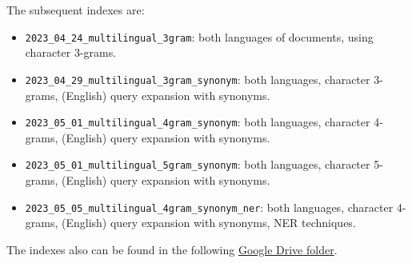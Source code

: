 The subsequent indexes are:
\begin{itemize}
	\item \texttt{2023\_04\_24\_multilingual\_3gram}: both languages of documents, using character 3-grams.
	\item \texttt{2023\_04\_29\_multilingual\_3gram\_synonym}: both languages, character 3-grams, (English) query expansion with synonyms.
	\item \texttt{2023\_05\_01\_multilingual\_4gram\_synonym}: both languages, character 4-grams, (English) query expansion with synonyms.
	\item \texttt{2023\_05\_01\_multilingual\_5gram\_synonym}: both languages, character 5-grams, (English) query expansion with synonyms.
	\item \texttt{2023\_05\_05\_multilingual\_4gram\_synonym\_ner}: both languages, character 4-grams, (English) query expansion with synonyms, NER techniques.
\end{itemize}

The indexes also can be found in the following
\href{https://drive.google.com/drive/folders/1CK_kLeZ5Us3VJe8hiG1vhwPrDs94cLvU?usp=share_link}{Google Drive folder}.\\

